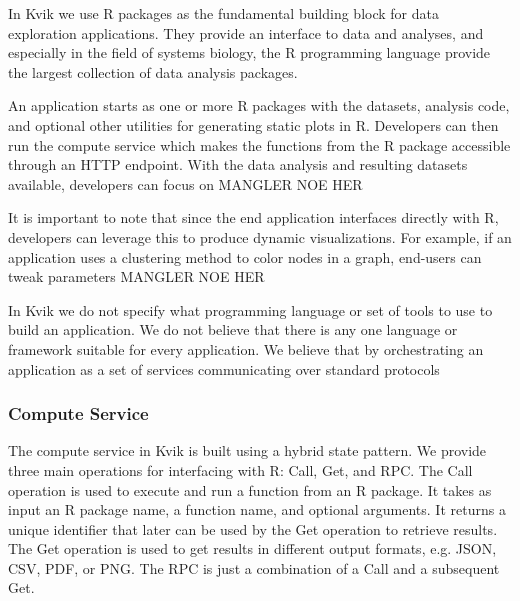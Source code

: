 
In Kvik we use R packages as the fundamental building block for data exploration
applications. They provide an interface to data and analyses, and especially in
the field of systems biology, the R programming language provide the largest
collection of data analysis packages. %

An application starts as one or more R packages with the datasets, analysis
code, and optional other utilities for generating static plots in R.  Developers
can then run the compute service which makes the functions from the R package
accessible through an HTTP endpoint. With the data analysis and resulting
datasets available, developers can focus on MANGLER NOE HER

It is important to note that since the end application interfaces directly with
R, developers can leverage this to produce dynamic visualizations. For example,
if an application uses a clustering method to color nodes in a graph, end-users
can tweak parameters MANGLER NOE HER


In Kvik we do not specify what programming language or set of tools to use to
build an application. We do not believe that there is any one language or
framework suitable for every application. We believe that by orchestrating an
application as a set of services communicating over standard protocols 

\subsubsection*{Compute Service}

The compute service in Kvik is built using a hybrid state
pattern\cite{opencpu}.
We provide three main operations for interfacing with R:
Call, Get, and RPC. The Call operation is used to execute and run a function
from an R package. It takes as input an R package name, a function name, and
optional arguments. It returns a unique identifier that later can be used by the
Get operation to retrieve results. The Get operation is used to get results in
different output formats, e.g. JSON, CSV, PDF, or PNG. The RPC is just a
combination of a Call and a subsequent Get. 

